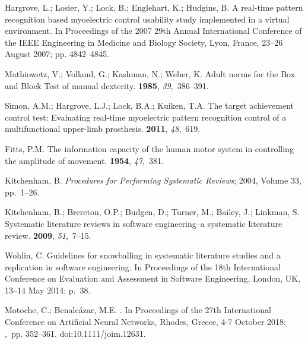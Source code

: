 \documentclass[sensors,review,accept,moreauthors,pdftex]{Definitions/mdpi}
\begin{document}
\begin{thebibliography}{999}
Hargrove, L.; Losier, Y.; Lock, B.; Englehart, K.; Hudgins, B.
\newblock A real-time pattern recognition based myoelectric control usability
  study implemented in a virtual environment.
In {Proceedings of the 2007 29th Annual International Conference of the IEEE Engineering in Medicine and Biology Society,} Lyon, France, 23--26 August 2007;  pp. 4842--4845.

Mathiowetz, V.; Volland, G.; Kashman, N.; Weber, K.
\newblock Adult norms for the Box and Block Test of manual dexterity.
 {\bf 1985}, {\em
  39},~386--391.

Simon, A.M.; Hargrove, L.J.; Lock, B.A.; Kuiken, T.A.
\newblock The target achievement control test: Evaluating real-time myoelectric
  pattern recognition control of a multifunctional upper-limb prosthesis.
 {\bf 2011},
  {\em 48},~619.

Fitts, P.M.
\newblock The information capacity of the human motor system in controlling the
  amplitude of movement.
 {\bf 1954}, {\em 47},~381.

Kitchenham, B.
\newblock \emph{Procedures for Performing Systematic Reviews};
 { 2004}, {Volume 33}, pp.~1--26.

Kitchenham, B.; Brereton, O.P.; Budgen, D.; Turner, M.; Bailey, J.; Linkman, S.
\newblock Systematic literature reviews in software engineering--a systematic
  literature review.
 {\bf 2009}, {\em
  51},~7--15.

Wohlin, C.
\newblock Guidelines for snowballing in systematic literature studies and a
  replication in software engineering.
In  Proceedings of the 18th International Conference on Evaluation and
  Assessment in Software Engineering, London, UK, 13--14 May 2014; p.~38.

Motoche, C.; Benalc{\'a}zar, M.E.
. In {Proceedings of the 27th International Conference on Artificial Neural Networks,} Rhodes, Greece, 4-7 October 2018;
,~pp. 352--361. doi:10.1111/joim.12631.


\end{thebibliography}
\end{document}
